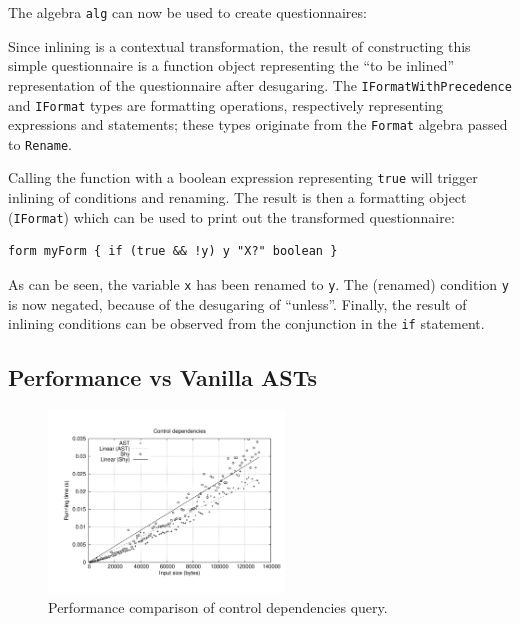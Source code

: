 The algebra \lstinline{alg} can now be used to create questionnaires:


Since inlining is a contextual transformation, the result of constructing this simple questionnaire is a function object representing the ``to be inlined'' representation of the questionnaire after desugaring.
The {\small\texttt{IFor\-mat\-With\-Pre\-cedence}} and \lstinline{IFormat} types are  formatting operations, respectively representing expressions and statements; these types originate from the \lstinline{Format} algebra passed to \lstinline{Rename}.

Calling the function with a boolean expression representing \lstinline{true} will trigger inlining of conditions and renaming. The result is then a formatting object (\lstinline{IFormat}) which can be used to print out the transformed questionnaire:

  \begin{lstlisting}[language=ql]
  form myForm { if (true && !y) y "X?" boolean }
  \end{lstlisting}

\noindent As can be seen, the variable \lstinline{x} has been renamed to \lstinline{y}.
The (renamed) condition \lstinline{y} is now negated, because of the desugaring of ``unless''.
Finally, the result of inlining conditions can be observed from the conjunction in the \lstinline[language=ql]{if} statement.


\subsection{\name Performance vs Vanilla ASTs}

\begin{figure}[t]
  \nocaptionrule
  \hspace*{-.05\textwidth}
  \includegraphics[width=0.56\textwidth]{plots/controldeps}
  \caption{Performance comparison of control dependencies query.\label{FIG:controlPerf}}
\end{figure}

